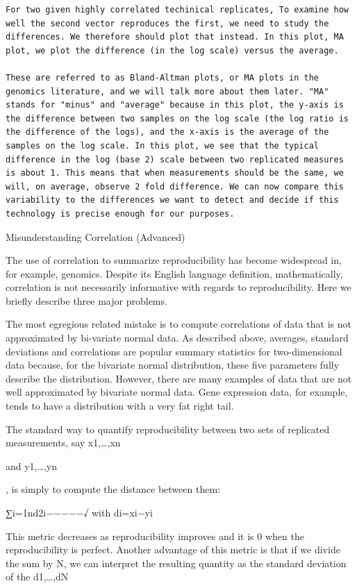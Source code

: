 \documentclass[
]{book}
\begin{document}
\begin{verbatim}
For two given highly correlated techinical replicates, To examine how well the second vector reproduces the first, we need to study the differences. We therefore should plot that instead. In this plot, MA plot, we plot the difference (in the log scale) versus the average.

These are referred to as Bland-Altman plots, or MA plots in the genomics literature, and we will talk more about them later. "MA" stands for "minus" and "average" because in this plot, the y-axis is the difference between two samples on the log scale (the log ratio is the difference of the logs), and the x-axis is the average of the samples on the log scale. In this plot, we see that the typical difference in the log (base 2) scale between two replicated measures is about 1. This means that when measurements should be the same, we will, on average, observe 2 fold difference. We can now compare this variability to the differences we want to detect and decide if this technology is precise enough for our purposes.
\end{verbatim}

Misunderstanding Correlation (Advanced)

The use of correlation to summarize reproducibility has become widespread in, for example, genomics. Despite its English language definition, mathematically, correlation is not necessarily informative with regards to reproducibility. Here we briefly describe three major problems.

The most egregious related mistake is to compute correlations of data that is not approximated by bi-variate normal data. As described above, averages, standard deviations and correlations are popular summary statistics for two-dimensional data because, for the bivariate normal distribution, these five parameters fully describe the distribution. However, there are many examples of data that are not well approximated by bivariate normal data. Gene expression data, for example, tends to have a distribution with a very fat right tail.

The standard way to quantify reproducibility between two sets of replicated measurements, say x1,\ldots,xn

and y1,\ldots,yn

, is simply to compute the distance between them:

∑i=1nd2i−−−−−√ with di=xi−yi

This metric decreases as reproducibility improves and it is 0 when the reproducibility is perfect. Another advantage of this metric is that if we divide the sum by N, we can interpret the resulting quantity as the standard deviation of the d1,\ldots,dN
\end{document}
